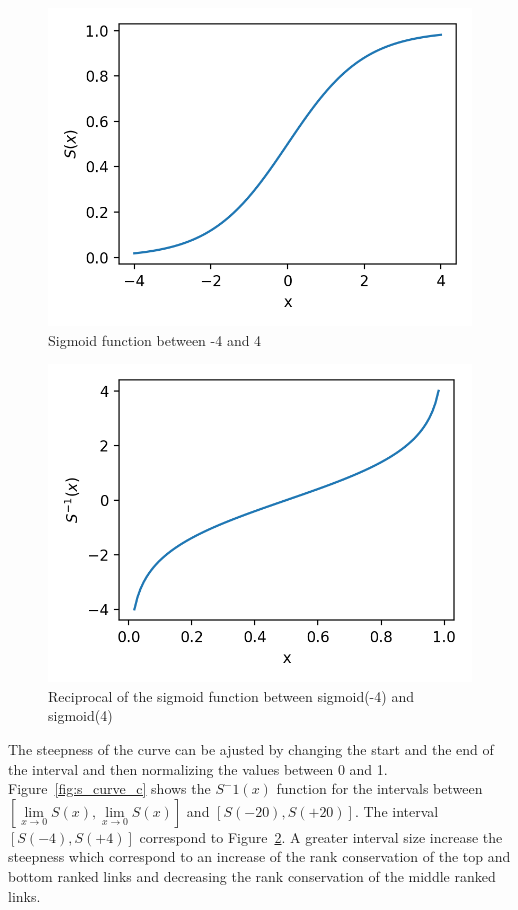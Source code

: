 \begin{figure}
  \includegraphics[width=\linewidth]{img/sigmoid.png}
  \caption{Sigmoid function between -4 and 4}
  \label{fig:sigmoid}
\end{figure}
\begin{figure}
  \includegraphics[width=\linewidth]{img/sigmoid_r.png}
  \caption{Reciprocal of the sigmoid function between sigmoid(-4) and sigmoid(4)}
  \label{fig:sigmoid_r}
\end{figure}

The steepness of the curve can be ajusted by changing the start and the end of the interval and then normalizing the values between 0 and 1. Figure~\ref{fig:s_curve_c} shows the $S^-1(x)$ function for the intervals between $\left[\lim\limits_{x \rightarrow 0}S(x), \lim\limits_{x \rightarrow 0}S(x)\right]$ and $\left[S(-20), S(+20)\right]$. The interval $\left[S(-4), S(+4)\right]$ correspond to Figure~\ref{fig:sigmoid_r}.
A greater interval size increase the steepness which correspond to an increase of the rank conservation of the top and bottom ranked links and decreasing the rank conservation of the middle ranked links.

